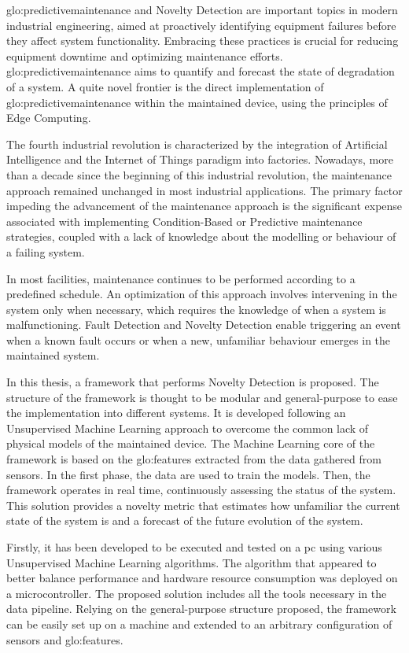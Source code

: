 \gls{glo:predictivemaintenance} and Novelty Detection are important topics in modern industrial engineering, aimed at proactively identifying equipment failures before they affect system functionality. Embracing these practices is crucial for reducing equipment downtime and optimizing maintenance efforts. \gls{glo:predictivemaintenance} aims to quantify and forecast the state of degradation of a system. A quite novel frontier is the direct implementation of \gls{glo:predictivemaintenance} within the maintained device, using the principles of Edge Computing.

The fourth industrial revolution is characterized by the integration of Artificial Intelligence and the Internet of Things paradigm into factories. Nowadays, more than a decade since the beginning of this industrial revolution, the maintenance approach remained unchanged in most industrial applications. The primary factor impeding the advancement of the maintenance approach is the significant expense associated with implementing Condition-Based or Predictive maintenance strategies, coupled with a lack of knowledge about the modelling or behaviour of a failing system.

In most facilities, maintenance continues to be performed according to a predefined schedule. An optimization of this approach involves intervening in the system only when necessary, which requires the knowledge of when a system is malfunctioning. Fault Detection and Novelty Detection enable triggering an event when a known fault occurs or when a new, unfamiliar behaviour emerges in the maintained system. 

In this thesis, a framework that performs Novelty Detection is proposed. The structure of the framework is thought to be modular and general-purpose to ease the implementation into different systems. It is developed following an Unsupervised Machine Learning approach to overcome the common lack of physical models of the maintained device. The Machine Learning core of the framework is based on the \gls{glo:feature}s extracted from the data gathered from sensors. In the first phase, the data are used to train the models. Then, the framework operates in real time, continuously assessing the status of the system. This solution provides a novelty metric that estimates how unfamiliar the current state of the system is and a forecast of the future evolution of the system.

Firstly, it has been developed to be executed and tested on a \gls{pc} using various Unsupervised Machine Learning algorithms. The algorithm that appeared to better balance performance and hardware resource consumption was deployed on a microcontroller. The proposed solution includes all the tools necessary in the data pipeline. Relying on the general-purpose structure proposed, the framework can be easily set up on a machine and extended to an arbitrary configuration of sensors and \gls{glo:feature}s. 

